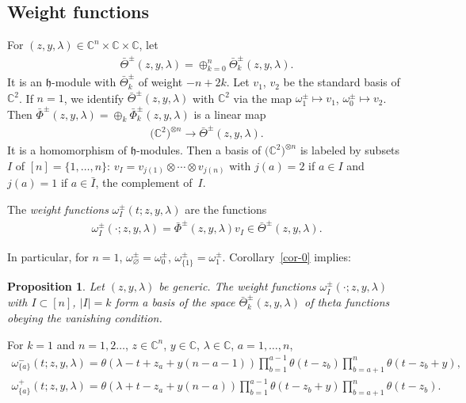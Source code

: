 \documentclass[10pt,a4paper]{amsart}
\numberwithin{equation}{section}
\newtheorem{Proposition}[Theorem]{Proposition}
 { \theoremstyle{definition}
\newtheorem{Definition}[Theorem]{Definition}
\newtheorem{Example}[Theorem]{Example}
\newtheorem{Remark}[Theorem]{Remark} }
\begin{document}
\subsection{Weight functions}\label{ss-3.5}
For $(z,y,\lambda)\in\mathbb C^n\times\mathbb C\times\mathbb C$, let
\begin{gather*}
\bar\Theta^\pm(z,y,\lambda)=\oplus_{k=0}^n \bar\Theta^\pm_k(z,y,\lambda).
\end{gather*}
It is an $\mathfrak h$-module with $\bar\Theta^\pm_{k}$ of weight $-n+2k$. Let $v_1$, $v_2$ be the standard basis of $\mathbb C^2$. If $n=1$, we identify $\bar \Theta^\pm(z,y,\lambda)$ with $\mathbb C^2$ via the map
$\omega^{\pm}_1\mapsto v_1$, $\omega^{\pm}_0\mapsto v_2$. Then $\bar\Phi^\pm(z,y,\lambda)=\oplus_k\bar\Phi^\pm_k(z,y,\lambda)$ is a linear map
\begin{gather*}
 \big(\mathbb C^2\big)^{\otimes n}\to \bar\Theta^\pm(z,y,\lambda).
\end{gather*}
It is a homomorphism of $\mathfrak h$-modules. Then a basis of $\big(\mathbb C^2\big)^{\otimes n}$ is labeled by subsets $I$ of $[n]=\{1,\dots,n\}$: $v_I=v_{j(1)}\otimes\cdots\otimes v_{j(n)}$ with $j(a)=2$ if $a\in I$ and $j(a)=1$ if $a\in\bar I$, the complement of~$I$.
\begin{Definition} The {\em weight functions} $\omega^\pm_I(t;z,y,\lambda)$ are the functions
 \begin{gather*}
 \omega^\pm_I(\cdot;z,y,\lambda)=\bar\Phi^{\pm}(z,y,\lambda)v_I\in \bar \Theta^\pm(z,y,\lambda).
 \end{gather*}
\end{Definition}
In particular, for $n=1$, $\omega^\pm_\varnothing=\omega^\pm_0$, $\omega^\pm_{\{1\}}=\omega_1^\pm$. Corollary~\ref{cor-0} implies:
\begin{Proposition}\label{p-basis} Let $(z,y,\lambda)$ be generic. The weight functions $\omega^\pm_I(\cdot; z,y,\lambda)$ with $I\subset [n]$, $|I|=k$ form a basis of the space $\bar\Theta^\pm_k(z,y,\lambda)$ of theta
functions obeying the vanishing condition.
\end{Proposition}
\begin{Example}\label{example-6} For $k=1$ and $n=1,2\dots$, $z\in\mathbb C^n$, $y\in\mathbb C$, $\lambda\in\mathbb C$, $a=1,\dots,n$,
 \begin{gather*}
 \omega^-_{\{a\}}(t;z,y,\lambda) =\theta(\lambda-t+z_a+y(n-a-1)) \prod_{b=1}^{a-1}\theta(t-z_b) \prod_{b=a+1}^n \theta(t-z_b+y),\\
 \omega^+_{\{a\}}(t;z,y,\lambda) =\theta(\lambda+t-z_a+y(n-a)) \prod_{b=1}^{a-1}\theta(t-z_b+y) \prod_{b=a+1}^n \theta(t-z_b).
 \end{gather*}
\end{Example}
\end{document}

